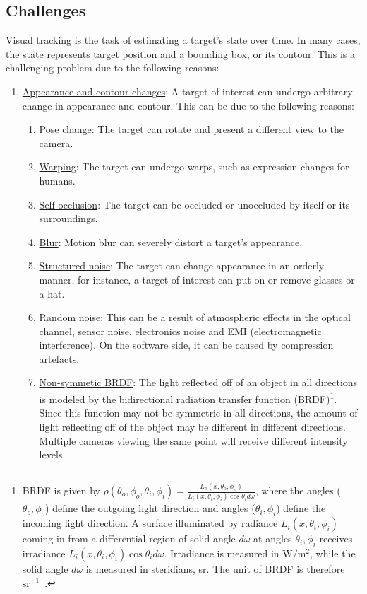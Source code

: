 \begin{Body}
\subsection{Challenges}
Visual tracking is the task of estimating a target's state over time.  In many cases, the state represents target position and a bounding box, or its contour.  This is a challenging problem due to the following reasons:

\begin{enumerate}
\item \underline{Appearance and contour changes}:  A target of interest can undergo arbitrary change in appearance and contour.  This can be due to the following reasons:
\begin{enumerate}
\item \underline{Pose change}:  The target can rotate and present a different view to the camera.
\item \underline{Warping}: The target can undergo warps, such as expression changes for humans.
\item \underline{Self occlusion}:  The target can be occluded or unoccluded by itself or its surroundings.
\item \underline{Blur}:  Motion blur can severely distort a target's appearance.
\item \underline{Structured noise}:  The target can change appearance in an orderly manner, for instance, a target of interest can put on or remove glasses or a hat.
\item \underline{Random noise}:  This can be a result of atmospheric effects in the optical channel, sensor noise, electronics noise and EMI (electromagnetic interference).  On the software side, it can be caused by compression artefacts.
\item \underline{Non-symmetic BRDF}:  The light reflected off of an object in all directions is modeled by the bidirectional radiation transfer function (BRDF)\footnote{BRDF is given by $\rho(\theta_o, \phi_o, \theta_i, \phi_i)=\frac{L_o(x, \theta_o, \phi_o)}{L_i(x, \theta_i, \phi_i)\cos\theta_i d\omega}$, where the angles ($\theta_o, \phi_o$) define the outgoing light direction and angles ($\theta_i, \phi_i$) define the incoming light direction.  A surface illuminated by radiance $L_i(x, \theta_i, \phi_i)$ coming in from a differential region of solid angle $d\omega$ at angles $\theta_i, \phi_i$ receives irradiance $L_i(x, \theta_i, \phi_i)\cos\theta_i d\omega$.  Irradiance is measured in $\mathrm{W/m^2}$, while the solid angle $d\omega$ is measured in steridians, sr.  The unit of BRDF is therefore $\mathrm{sr^{-1}}$~\cite{2002_BOOK_CV_Forsyth}.}.  Since this function may not be symmetric in all directions, the amount of light reflecting off of the object may be different in different directions.  Multiple cameras viewing the same point will receive different intensity levels.

\end{enumerate}
\end{enumerate}
\end{Body}
